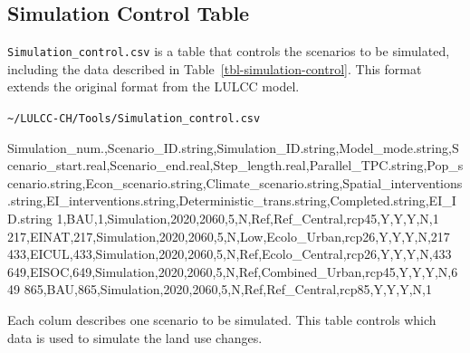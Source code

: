 \documentclass[
  letterpaper,
  DIV=11,
  numbers=noendperiod]{scrreprt}
\newenvironment{Shaded}{\begin{snugshade}}{\end{snugshade}}
\newcommand{\NormalTok}[1]{\textcolor[rgb]{0.00,0.23,0.31}{#1}}
\begin{document}
\subsection{Simulation Control Table}\label{simulation-control-table}

\texttt{Simulation\_control.csv} is a table that controls the scenarios
to be simulated, including the data described in
Table~\ref{tbl-simulation-control}. This format extends the original
format from the LULCC model.

\begin{codelisting}

\caption{\texttt{\textasciitilde/LULCC-CH/Tools/Simulation\_control.csv}}

\begin{Shaded}
\begin{Highlighting}[]
\NormalTok{Simulation\_num.,Scenario\_ID.string,Simulation\_ID.string,Model\_mode.string,Scenario\_start.real,Scenario\_end.real,Step\_length.real,Parallel\_TPC.string,Pop\_scenario.string,Econ\_scenario.string,Climate\_scenario.string,Spatial\_interventions.string,EI\_interventions.string,Deterministic\_trans.string,Completed.string,EI\_ID.string}
\NormalTok{1,BAU,1,Simulation,2020,2060,5,N,Ref,Ref\_Central,rcp45,Y,Y,Y,N,1}
\NormalTok{217,EINAT,217,Simulation,2020,2060,5,N,Low,Ecolo\_Urban,rcp26,Y,Y,Y,N,217}
\NormalTok{433,EICUL,433,Simulation,2020,2060,5,N,Ref,Ecolo\_Central,rcp26,Y,Y,Y,N,433}
\NormalTok{649,EISOC,649,Simulation,2020,2060,5,N,Ref,Combined\_Urban,rcp45,Y,Y,Y,N,649}
\NormalTok{865,BAU,865,Simulation,2020,2060,5,N,Ref,Ref\_Central,rcp85,Y,Y,Y,N,1}
\end{Highlighting}
\end{Shaded}

\end{codelisting}

Each colum describes one scenario to be simulated. This table controls
which data is used to simulate the land use changes.
\end{document}
